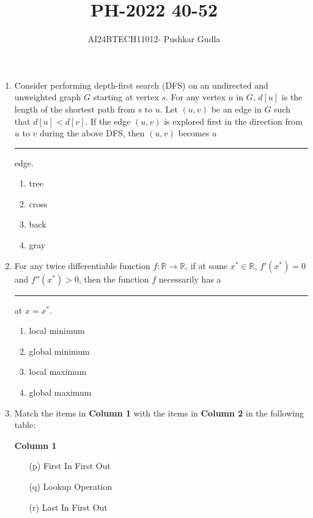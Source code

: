 \documentclass[journal,12pt,onecolumn]{IEEEtran}
\theoremstyle{remark}
\begin{document}

\vspace{3cm}

\title{\textbf{PH-2022 40-52}}
\author{AI24BTECH11012- Pushkar Gudla}
\maketitle
\bigskip

\renewcommand{\thefigure}{\theenumi}
\renewcommand{\thetable}{\theenumi}
\setlength{\columnsep}{2.5em}

\begin{enumerate}
	\item Consider performing depth-first search (DFS) on an undirected and unweighted graph $G$ starting at vertex $s$. For any vertex $u$ in $G$, $d[u]$ is the length of the shortest path from $s$ to $u$. Let $(u,v)$ be an edge in $G$ such that $d[u]<d[v]$. If the edge $(u,v)$ is explored first in the direction from $u$ to $v$ during the above DFS, then $(u,v)$ becomes a \rule{1.5cm}{0.4pt}edge.
	\begin{enumerate}
	\item tree
	\item cross
	\item back
	\item gray
	\end{enumerate}

\item For any twice differentiable function $ f : \mathbb{R} \to \mathbb{R} $, if at some $ x^* \in \mathbb{R} $, $ f'(x^*) = 0 $ and $ f''(x^*) > 0 $, then the function $ f $ necessarily has a \rule{1.5cm}{0.4pt} at $ x = x^* $.

\begin{enumerate}
    \item local minimum
    \item global minimum
    \item local maximum
    \item global maximum
\end{enumerate}

\item Match the items in \textbf{Column 1} with the items in \textbf{Column 2} in the following table:

\begin{multicols}{2}
\textbf{Column 1}
\begin{enumerate}
    \item[(p)] First In First Out
    \item[(q)] Lookup Operation
    \item[(r)] Last In First Out
\end{enumerate}


\end{multicols}
\end{enumerate}
\end{document}
